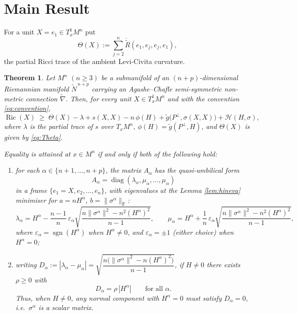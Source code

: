 \documentclass[11pt]{article}
\newtheorem{theorem}{Theorem}[section]
\theoremstyle{definition}
\newcommand{\tN}{\widetilde{N}}
\newcommand{\tg}{\widetilde{g}}
\newcommand{\tnabla}{\widetilde{\nabla}}
\newcommand{\ctR}{\mathring{\widetilde{R}}}
\newcommand{\Ric}{\operatorname{Ric}}
\newcommand{\sgn}{\operatorname{sgn}}
\newcommand{\HH}{\mathcal{H}}
\newcommand{\Frob}{\mathrm{F}}
\begin{document}
\section{Main Result}\label{sec:main}
For a unit $X=e_1\in T^1_xM^n$ put
\begin{equation}\label{eq:Theta}
\Theta(X):=\sum_{j=2}^{n}\ctR(e_1,e_j,e_j,e_1),
\end{equation}
the partial Ricci trace of the ambient Levi-Civita curvature.

\begin{theorem}\label{thm:main}
Let $M^n$ $(n\ge3)$ be a submanifold of an $(n+p)$-dimensional Riemannian manifold $\tN^{\,n+p}$ carrying an Agashe--Chafle semi-symmetric non-metric connection $\tnabla$. Then, for every unit $X\in T^1_xM^n$ and with the convention \eqref{eq:convention},
\begin{equation}\label{eq:mainineq}
\Ric(X)\;\ge\;\Theta(X)-\lambda+s(X,X)-n\,\phi(H)+\tg\bigl(P^\perp,\sigma(X,X)\bigr)+\HH(H,\sigma),
\end{equation}
where $\lambda$ is the partial trace of $s$ over $T_xM^n$, $\phi(H)=\tg(P^\perp,H)$, and $\Theta(X)$ is given by \eqref{eq:Theta}.

Equality is attained at $x\in M^n$ if and only if both of the following hold:
\begin{enumerate}[label=(\roman*)]
\item for each $\alpha\in\{n+1,\dots,n+p\}$, the matrix $A_\alpha$ has the quasi-umbilical form
\begin{equation}\label{eq:quasiform}
A_\alpha=\operatorname{diag}(\lambda_\alpha,\mu_\alpha,\dots,\mu_\alpha)
\end{equation}
in a frame $\{e_1=X,e_2,\dots,e_n\}$, with eigenvalues at the Lemma \ref{lem:hineva} minimiser for $a=nH^\alpha$, $b=\|\sigma^\alpha\|_{\Frob}$:
\begin{equation}\label{eq:eigenvals3}
\lambda_\alpha=H^\alpha-\frac{n-1}{n}\,\varepsilon_\alpha\sqrt{\frac{n\|\sigma^\alpha\|^2-n^2(H^\alpha)^2}{n-1}},\qquad
\mu_\alpha=H^\alpha+\frac{1}{n}\,\varepsilon_\alpha\sqrt{\frac{n\|\sigma^\alpha\|^2-n^2(H^\alpha)^2}{n-1}},
\end{equation}
where $\varepsilon_\alpha=\sgn(H^\alpha)$ when $H^\alpha\neq0$, and $\varepsilon_\alpha=\pm1$ (either choice) when $H^\alpha=0$;
\item writing $D_\alpha:=|\lambda_\alpha-\mu_\alpha|=\sqrt{\dfrac{n\bigl(\|\sigma^\alpha\|^2-n(H^\alpha)^2\bigr)}{n-1}}$, if $H\neq0$ there exists $\rho\ge0$ with
\begin{equation}\label{eq:proportion}
D_\alpha=\rho\,|H^\alpha|\qquad\text{for all }\alpha.
\end{equation}
Thus, when $H\neq0$, any normal component with $H^\alpha=0$ must satisfy $D_\alpha=0$, i.e.\ $\sigma^\alpha$ is a scalar matrix. 
\end{enumerate}
\end{theorem}
\end{document}
